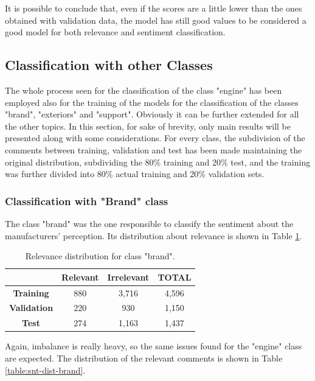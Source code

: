 It is possible to conclude that, even if the scores are a little lower than the ones obtained with validation data, the model has still good values to be considered a good model for both relevance and sentiment classification.


\subsection{Classification with other Classes}

The whole process seen for the classification of the class "engine" has been employed also for the training of the models for the classification of the classes "brand", "exteriors" and "support". Obviously it can be further extended for all the other topics. In this section, for sake of brevity, only main results will be presented along with some considerations. For every class, the subdivision of the comments between training, validation and test has been made maintaining the original distribution, subdividing the 80\% training and 20\% test, and the training was further divided into 80\% actual training and 20\% validation sets.

\subsubsection{Classification with "Brand" class}

The class "brand" was the one responsible to classify the sentiment about the manufacturers' perception. Its distribution about relevance is shown in Table \ref{table:rel-dist-brand}.

\begin{table}[H]
	\centering
	\begin{tabular}{ | c | c  c | c | } 
		\hline
		& \textbf{Relevant} & \textbf{Irrelevant} & \textbf{TOTAL} \\
		\hline
		\textbf{Training} & 880 & 3,716 & 4,596 \\ 
		\hline
		\textbf{Validation} & 220 & 930 & 1,150 \\ 
		\hline
		\textbf{Test} & 274 & 1,163 & 1,437 \\
		\hline
	\end{tabular}
	\caption{Relevance distribution for class "brand".}
	\label{table:rel-dist-brand}
\end{table}

Again, imbalance is really heavy, so the same issues found for the "engine" class are expected. The distribution of the relevant comments is shown in Table \ref{table:snt-dist-brand}.

